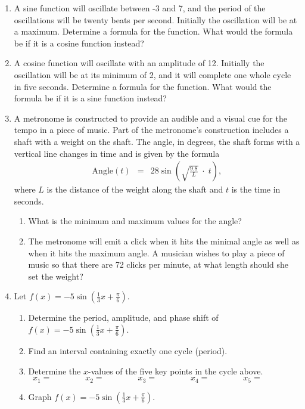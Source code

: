 \begin{enumerate}

\item A sine function will oscillate between -3 and 7, and the period
  of the oscillations will be twenty beats per second. Initially the
  oscillation will be at a maximum. Determine a formula for the
  function. What would the formula be if it is a cosine function instead?

\item A cosine function will oscillate with an amplitude of
  12. Initially the oscillation will be at its minimum of 2, and it
  will complete one whole cycle in five seconds. Determine a formula
  for the function. What would the formula be if it is a sine function
  instead?

\item A metronome is constructed to provide an audible and a visual
  cue for the tempo in a piece of music. Part of the metronome's
  construction includes a shaft with a weight on the shaft. The angle,
  in degrees, the shaft forms with a vertical line changes in time and
  is given by the formula
  \begin{eqnarray*}
    \mathrm{Angle}(t) & = & 28 \sin\left( \sqrt{\frac{9.8}{L}} \; \cdot \; t \right),
  \end{eqnarray*}
  where $L$ is the distance of the weight along the shaft and $t$ is
  the time in seconds.
  \begin{enumerate}
  \item What is the minimum and maximum values for the angle?
  \item The metronome will emit a click when it hits the minimal angle
    as well as when it hits the maximum angle.  A musician wishes to
    play a piece of music so that there are 72 clicks per minute, at
    what length should she set the weight?
  \end{enumerate}

\item Let $\displaystyle f(x)=-5\sin\left(\frac{1}{3}x+\frac{\pi}{6}\right)$.
\begin{enumerate}
\item Determine the period, amplitude, and phase shift of
  $\displaystyle f(x)=-5\sin\left(\frac{1}{3}x+\frac{\pi}{6}\right)$.
\item Find an interval containing exactly one cycle (period).
\item Determine the $x$-values of the five key points in the cycle above.
$$x_1= \quad \quad \quad \quad x_2= \quad \quad \quad \quad x_3= \quad \quad \quad \quad x_4= \quad \quad \quad \quad x_5= \quad \quad \quad \quad$$
\item Graph $\displaystyle f(x)=-5\sin\left(\frac{1}{3}x+\frac{\pi}{6}\right)$.


\end{enumerate}
\end{enumerate}
